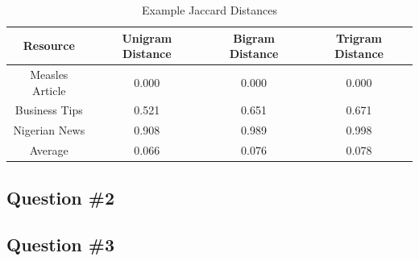 \documentclass[a4paper,12pt]{article}
\begin{document}
\begin{table}[H]
\centering
\caption{Example Jaccard Distances}
\begin{tabular}{ | c | c | c | c | }
\hline
\textbf{Resource}  & \textbf{Unigram Distance} & \textbf{Bigram Distance} & \textbf{Trigram Distance} \\ \hline
Measles Article & 0.000  & 0.000  & 0.000  \\ \hline
Business Tips   & 0.521  & 0.651  & 0.671  \\ \hline
Nigerian News   & 0.908  & 0.989  & 0.998  \\ \hline
Average         & 0.066  & 0.076  & 0.078  \\ \hline
\end{tabular}
\end{table}


\subsection{Question \#2}

\subsection{Question \#3}
\end{document}
